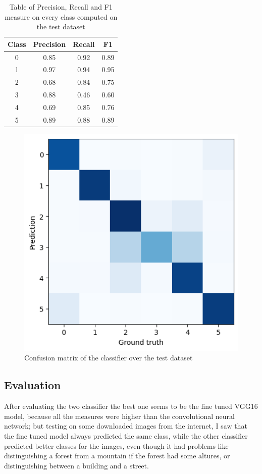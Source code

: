 \documentclass[12pt,journal,compsoc]{IEEEtran}
\begin{document}
\begin{table}[ht]
	\centering
	\begin{tabular}{c c c c }
		Class & Precision & Recall & F1  \\
		\hline
		0 & 0.85 & 0.92 &0.89     \\
		1 & 0.97 & 0.94 &0.95       \\
		2 & 0.68 &0.84  &0.75       \\
		3 & 0.88 &0.46  &0.60       \\ 
		4 & 0.69 &0.85  &0.76       \\
		5 & 0.89 & 0.88 &0.89       \\
		
	\end{tabular}
	\caption{Table of Precision, Recall and F1 measure on every class computed on the test dataset}
	\end{table}
	\begin{figure}[H]
		\begin{center}
		\includegraphics[scale=.75]{./images/confmat_vgg16.png}
		\end{center}
		\caption{Confusion matrix of the classifier over the test dataset}
	\end{figure}
\subsection{Evaluation}
After evaluating the two classifier the best one seems to be the fine tuned VGG16 model, because all the measures were higher than the convolutional neural network; but testing on some downloaded images from the internet, I saw that the fine tuned model always predicted the same class, while the other classifier predicted better classes for the images, even though it had problems like distinguishing a forest from a mountain if the forest had some altures, or distinguishing between a building and a street.
\end{document}
